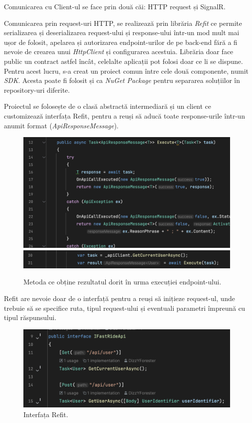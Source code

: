 Comunicarea cu Client-ul se face prin două căi: HTTP request și SignalR.

Comunicarea prin request-uri HTTP, se realizează prin librăria \textit{Refit} ce permite
serializarea și deserializarea request-ului și response-ului într-un mod mult mai ușor de folosit,
apelarea și autorizarea endpoint-urilor de pe back-end fără a fi nevoie de crearea unui \textit{HttpClient}
și configurarea acestuia. Librăria doar face public un contract astfel încât, celelalte aplicații pot folosi doar ce li se dispune.
Pentru acest lucru, s-a creat un proiect comun între cele două componente, numit \textit{SDK}.
Acesta poate fi folosit și ca \textit{NuGet Package} pentru separarea soluțiilor în repository-uri diferite.

Proiectul se folosește de o clasă abstractă intermediară și un client ce customizează interfața Refit,
pentru a reuși să aducă toate response-urile într-un anumit format (\textit{ApiResponseMessage}).

\begin{figure}[H]
    \centering
    \includegraphics[width=14cm]{Assets/refitAbstract.png}
    \includegraphics[width=14cm]{Assets/userRefitAbstract.png}
    \caption{Metoda ce obține rezultatul dorit în urma execuției endpoint-ului.}
    \label{fig:refitAbstract}
\end{figure}

Refit are nevoie doar de o interfață pentru a reuși să inițieze request-ul, unde trebuie să se specifice ruta, tipul request-ului și eventuali parametri
împreună cu tipul răspunsului.

\begin{figure}[H]
    \centering
    \includegraphics[width=14cm]{Assets/refitInterface.png}
    \caption{Interfața Refit.}
    \label{fig:refitInterface}
\end{figure}

